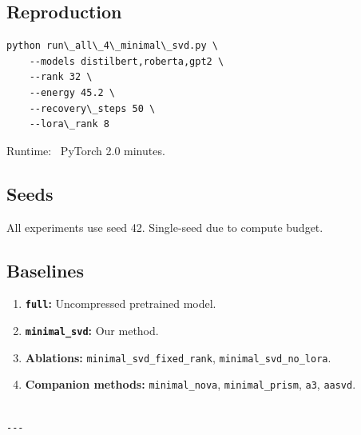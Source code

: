 \subsection{Reproduction}

\begin{lstlisting}
python run\_all\_4\_minimal\_svd.py \
    --models distilbert,roberta,gpt2 \
    --rank 32 \
    --energy 45.2 \
    --recovery\_steps 50 \
    --lora\_rank 8
\end{lstlisting}

Runtime: ~PyTorch 2.0 minutes.

\subsection{Seeds}

All experiments use seed 42. Single-seed due to compute budget.

\subsection{Baselines}

\begin{enumerate}
\item \textbf{\texttt{full}:} Uncompressed pretrained model.
\item \textbf{\texttt{minimal\_svd}:} Our method.
\item \textbf{Ablations:} \texttt{minimal\_svd\_fixed\_rank}, \texttt{minimal\_svd\_no\_lora}.
\item \textbf{Companion methods:} \texttt{minimal\_nova}, \texttt{minimal\_prism}, \texttt{a3}, \texttt{aasvd}.
\end{enumerate}
\begin{lstlisting}

---
\end{lstlisting}